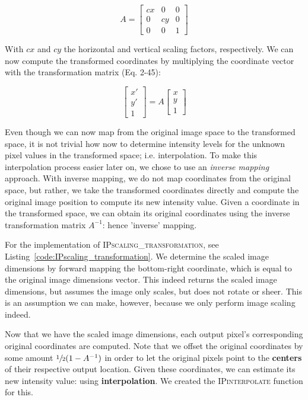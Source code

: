 \documentclass{article}
\begin{document}
\begin{figure}[ht]
\[A = 
\begin{bmatrix}
cx & 0 & 0\\
0 & cy & 0\\
0 & 0 & 1
\end{bmatrix}
 \]
\end{figure}

With $cx$ and $cy$ the horizontal and vertical scaling factors, respectively. We can now compute the transformed coordinates by multiplying the coordinate vector with the transformation matrix (Eq. 2-45):

\begin{figure}[ht]
\[ 
\begin{bmatrix}
x'\\
y'\\
1
\end{bmatrix}
= A
\begin{bmatrix}
x\\
y\\
1
\end{bmatrix}
 \]
\end{figure}

Even though we can now map from the original image space to the transformed space, it is not trivial how now to determine intensity levels for the unknown pixel values in the transformed space; i.e. interpolation. To make this interpolation process easier later on, we chose to use an \textit{inverse mapping} approach. With inverse mapping, we do not map coordinates from the original space, but rather, we take the transformed coordinates directly and compute the original image position to compute its new intensity value. Given a coordinate in the transformed space, we can obtain its original coordinates using the inverse transformation matrix $A^{-1}$: hence 'inverse' mapping.

 For the implementation of \textsc{IPscaling\_transformation}, see Listing~\ref{code:IPscaling_transformation}. We determine the scaled image dimensions by forward mapping the bottom-right coordinate, which is equal to the original image dimensions vector. This indeed returns the scaled image dimensions, but assumes the image only scales, but does not rotate or sheer. This is an assumption we can make, however, because we only perform image scaling indeed.

Now that we have the scaled image dimensions, each output pixel's corresponding original coordinates are computed. Note that we offset the original coordinates by some amount $\sfrac{1}{2}(1 - A^{-1})$ in order to let the original pixels point to the \textbf{centers} of their respective output location.
Given these coordinates, we can estimate its new intensity value: using \textbf{interpolation}. We created the \textsc{IPinterpolate} function for this.
\end{document}
